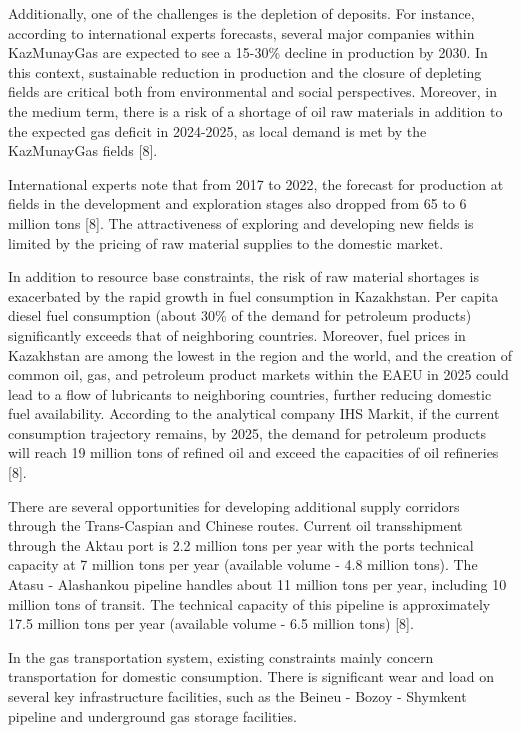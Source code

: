 Additionally, one of the challenges is the depletion of deposits. For
instance, according to international experts\textquotesingle{}
forecasts, several major companies within KazMunayGas are expected to
see a 15-30\% decline in production by 2030. In this context,
sustainable reduction in production and the closure of depleting fields
are critical both from environmental and social perspectives. Moreover,
in the medium term, there is a risk of a shortage of oil raw materials
in addition to the expected gas deficit in 2024-2025, as local demand is
met by the KazMunayGas fields {[}8{]}.

International experts note that from 2017 to 2022, the forecast for
production at fields in the development and exploration stages also
dropped from 65 to 6 million tons {[}8{]}. The attractiveness of
exploring and developing new fields is limited by the pricing of raw
material supplies to the domestic market.

In addition to resource base constraints, the risk of raw material
shortages is exacerbated by the rapid growth in fuel consumption in
Kazakhstan. Per capita diesel fuel consumption (about 30\% of the demand
for petroleum products) significantly exceeds that of neighboring
countries. Moreover, fuel prices in Kazakhstan are among the lowest in
the region and the world, and the creation of common oil, gas, and
petroleum product markets within the EAEU in 2025 could lead to a flow
of lubricants to neighboring countries, further reducing domestic fuel
availability. According to the analytical company IHS Markit, if the
current consumption trajectory remains, by 2025, the demand for
petroleum products will reach 19 million tons of refined oil and exceed
the capacities of oil refineries {[}8{]}.

There are several opportunities for developing additional supply
corridors through the Trans-Caspian and Chinese routes. Current oil
transshipment through the Aktau port is 2.2 million tons per year with
the port\textquotesingle s technical capacity at 7 million tons per year
(available volume - 4.8 million tons). The Atasu - Alashankou pipeline
handles about 11 million tons per year, including 10 million tons of
transit. The technical capacity of this pipeline is approximately 17.5
million tons per year (available volume - 6.5 million tons) {[}8{]}.

In the gas transportation system, existing constraints mainly concern
transportation for domestic consumption. There is significant wear and
load on several key infrastructure facilities, such as the Beineu -
Bozoy - Shymkent pipeline and underground gas storage facilities.


